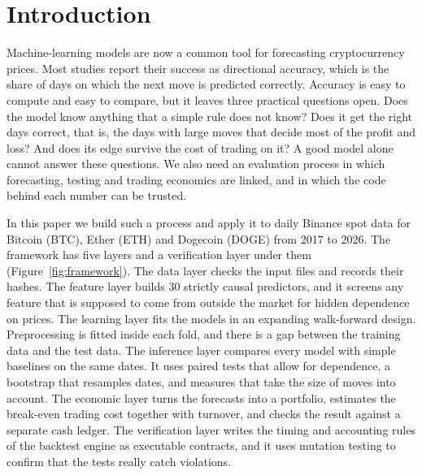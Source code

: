 \documentclass[preprint,12pt,authoryear,a4paper]{elsarticle}
\begin{document}
\section{Introduction}\label{sec:intro}

Machine-learning models are now a common tool for forecasting cryptocurrency
prices. Most studies report their success as directional accuracy, which is the
share of days on which the next move is predicted correctly. Accuracy is easy to
compute and easy to compare, but it leaves three practical questions open. Does the
model know anything that a simple rule does not know? Does it get the right days
correct, that is, the days with large moves that decide most of the profit and
loss? And does its edge survive the cost of trading on it? A good model alone cannot
answer these questions. We also need an evaluation process in which forecasting,
testing and trading economics are linked, and in which the code behind each number
can be trusted.

In this paper we build such a process and apply it to daily Binance spot data for
Bitcoin (BTC), Ether (ETH) and Dogecoin (DOGE) from 2017 to 2026. The framework has
five layers and a verification layer under them (Figure~\ref{fig:framework}). The
data layer checks the input files and records their hashes. The feature layer
builds 30 strictly causal predictors, and it screens any feature that is supposed
to come from outside the market for hidden dependence on prices. The learning layer
fits the models in an expanding walk-forward design. Preprocessing is fitted inside
each fold, and there is a gap between the training data and the test data. The
inference layer compares every model with simple baselines on the same dates. It
uses paired tests that allow for dependence, a bootstrap that resamples dates, and
measures that take the size of moves into account. The economic layer turns the
forecasts into a portfolio, estimates the break-even trading cost together with
turnover, and checks the result against a separate cash ledger. The verification
layer writes the timing and accounting rules of the backtest engine as executable
contracts, and it uses mutation testing to confirm that the tests really catch
violations.
\end{document}
